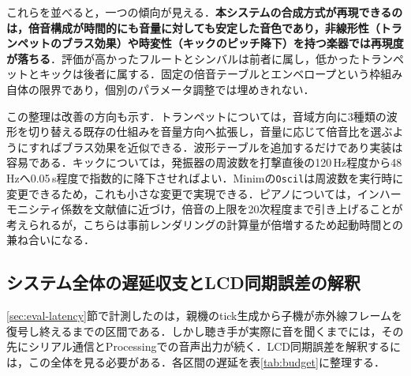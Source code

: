 \documentclass[uplatex,dvipdfmx]{jlreq}
\begin{document}
これらを並べると，一つの傾向が見える．\textbf{本システムの合成方式が再現できるのは，倍音構成が時間的にも音量に対しても安定した音色であり，非線形性（トランペットのブラス効果）や時変性（キックのピッチ降下）を持つ楽器では再現度が落ちる}．評価が高かったフルートとシンバルは前者に属し，低かったトランペットとキックは後者に属する．固定の倍音テーブルとエンベロープという枠組み自体の限界であり，個別のパラメータ調整では埋めきれない．

この整理は改善の方向も示す．トランペットについては，音域方向に3種類の波形を切り替える既存の仕組みを音量方向へ拡張し，音量に応じて倍音比を選ぶようにすればブラス効果を近似できる．波形テーブルを追加するだけであり実装は容易である．キックについては，発振器の周波数を打撃直後の120\,Hz程度から48\,Hzへ0.05\,s程度で指数的に降下させればよい．Minimの\texttt{Oscil}は周波数を実行時に変更できるため，これも小さな変更で実現できる．ピアノについては，インハーモニシティ係数を文献値に近づけ，倍音の上限を20次程度まで引き上げることが考えられるが，こちらは事前レンダリングの計算量が倍増するため起動時間との兼ね合いになる．

\subsection{システム全体の遅延収支とLCD同期誤差の解釈}
\label{sec:disc-budget}

\ref{sec:eval-latency}節で計測したのは，親機のtick生成から子機が赤外線フレームを復号し終えるまでの区間である．しかし聴き手が実際に音を聞くまでには，その先にシリアル通信とProcessingでの音声出力が続く．LCD同期誤差を解釈するには，この全体を見る必要がある．各区間の遅延を表\ref{tab:budget}に整理する．
\end{document}
